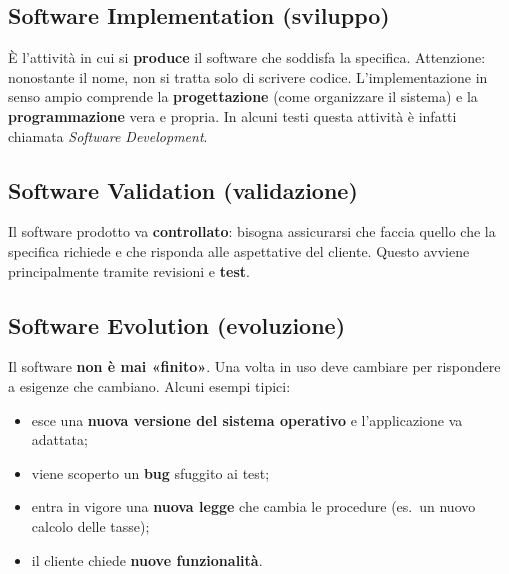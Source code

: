 \subsection{Software Implementation (sviluppo)}

È l'attività in cui si \textbf{produce} il software che soddisfa la specifica. Attenzione: nonostante il nome, non si tratta
solo di scrivere codice. L'implementazione in senso ampio comprende la \textbf{progettazione} (come organizzare il sistema)
e la \textbf{programmazione} vera e propria. In alcuni testi questa attività è infatti chiamata \textit{Software Development}.

\subsection{Software Validation (validazione)}

Il software prodotto va \textbf{controllato}: bisogna assicurarsi che faccia quello che la specifica richiede
e che risponda alle aspettative del cliente. Questo avviene principalmente tramite revisioni e \textbf{test}.

\subsection{Software Evolution (evoluzione)}

Il software \textbf{non è mai «finito»}. Una volta in uso deve cambiare per rispondere a esigenze che cambiano. Alcuni esempi tipici:
\begin{itemize}
  \item esce una \textbf{nuova versione del sistema operativo} e l'applicazione va adattata;
  \item viene scoperto un \textbf{bug} sfuggito ai test;
  \item entra in vigore una \textbf{nuova legge} che cambia le procedure (es.\ un nuovo calcolo delle tasse);
  \item il cliente chiede \textbf{nuove funzionalità}.
\end{itemize}


